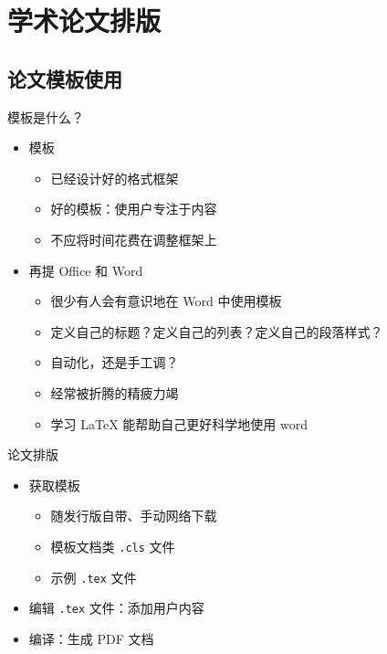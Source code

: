 \section{学术论文排版}
\subsection{论文模板使用}

\begin{frame}{模板是什么？}
  \begin{itemize}
    \item 模板
      \begin{itemize}
        \item 已经设计好的格式框架
        \item 好的模板：使用户专注于内容
        \item 不应将时间花费在调整框架上
      \end{itemize}
    \item 再提 Office 和 Word
      \begin{itemize}
        \item 很少有人会有意识地在 Word 中使用模板
        \item 定义自己的标题？定义自己的列表？定义自己的段落样式？
        \item 自动化，还是手工调？
        \item 经常被折腾的精疲力竭
        \item 学习 \LaTeX{} 能帮助自己更好科学地使用 word
      \end{itemize}
  \end{itemize}
\end{frame}

\begin{frame}{论文排版}
  \begin{itemize}
    \item 获取模板
      \begin{itemize}
        \item 随发行版自带、手动网络下载
        \item 模板文档类 \texttt{.cls} 文件
        \item 示例 \texttt{.tex} 文件
      \end{itemize}
    \item 编辑 \texttt{.tex} 文件：添加用户内容
    \item 编译：生成 PDF 文档
  \end{itemize}
\end{frame}

